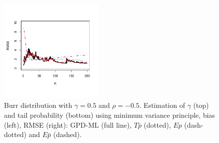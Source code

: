 \begin{figure}[!ht]
\includegraphics[width=0.45\textwidth]{./plots/paper3/burr05GPD_tail_rmse.pdf} 
 \caption{ Burr distribution with $\gamma=0.5$ and $\rho=-0.5$. Estimation of $\gamma$ (top) and tail probability (bottom) using minimum variance principle, bias (left), RMSE (right): GPD-ML (full line), $T\bar{p}$ (dotted), $Ep$ (dash-dotted) and $E\bar{p}$ (dashed). }
\label{paper3:fig2}
\end{figure}
